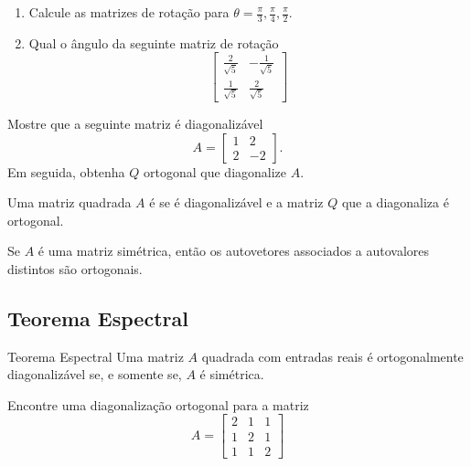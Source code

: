 \begin{frame}[label=orto]
\begin{casa}
\begin{enumerate}
\item Calcule as matrizes de rotação para $\theta=\frac{\pi}{3},\frac{\pi}{4}, \frac{\pi}{2}$.

\item Qual o ângulo da seguinte matriz de rotação
\[
\begin{bmatrix}
\frac{2}{\sqrt{5}} & -\frac{1}{\sqrt{5}} \\[1em] \frac{1}{\sqrt{5}} & \frac{2}{\sqrt{5}}
\end{bmatrix}
\]
\end{enumerate}
\end{casa}

\end{frame}


\begin{frame}[label=orto]{}

\begin{exe}
Mostre que  a seguinte matriz é diagonalizável
\[A=
\begin{bmatrix}
1& 2\\ 2 & -2
\end{bmatrix}.
\]
Em seguida, obtenha $Q$ ortogonal que diagonalize $A$.
\end{exe}

\begin{defin}
Uma matriz quadrada $A$ é  se é 
diagonalizável e a matriz $Q$ que a diagonaliza é ortogonal.
\end{defin}

\begin{prop}
Se $A$ é uma matriz simétrica, então os autovetores associados a autovalores distintos são ortogonais.
\end{prop}

\end{frame}

\subsection*{Teorema Espectral}

\begin{frame}[label=orto]{}

\begin{block}{Teorema Espectral}
Uma matriz  $A$ quadrada com entradas reais  é ortogonalmente diagonalizável se, e somente se, $A$ é simétrica.
\end{block}

\begin{exe}
Encontre  uma diagonalização ortogonal para a matriz
\[A=
\begin{bmatrix}
2 & 1 & 1\\ 1& 2 & 1 \\ 1 & 1 & 2
\end{bmatrix}
\]
\end{exe}

\end{frame}
